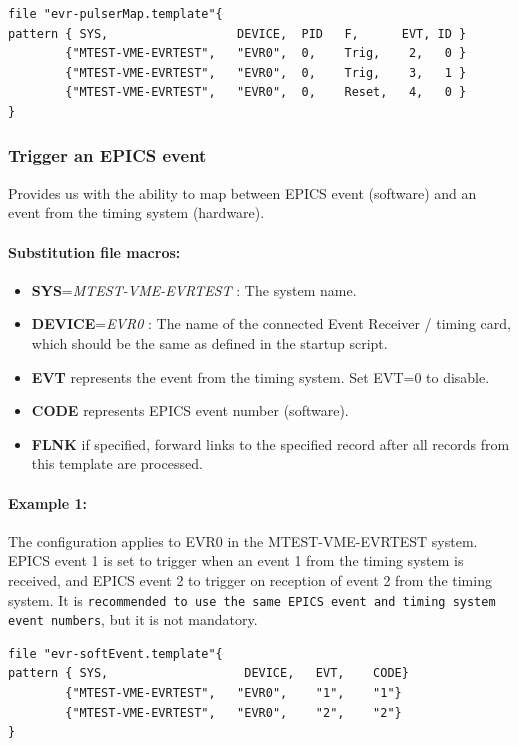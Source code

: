 \documentclass[12pt,a4paper]{article}
\begin{document}
\begin{verbatim}
file "evr-pulserMap.template"{
pattern { SYS,                  DEVICE,  PID   F,      EVT, ID }
        {"MTEST-VME-EVRTEST",   "EVR0",  0,    Trig,    2,   0 }
        {"MTEST-VME-EVRTEST",   "EVR0",  0,    Trig,    3,   1 }
        {"MTEST-VME-EVRTEST",   "EVR0",  0,    Reset,   4,   0 }
}
\end{verbatim}


\subsubsection{Trigger an EPICS event}\label{evr-softevent.template}
Provides us with the ability to map between EPICS event (software) and an event from the timing system (hardware).

\paragraph{Substitution file macros:}
\begin{itemize}
	\item
		\textbf{SYS}=\emph{MTEST-VME-EVRTEST} : The system name.
	\item
		\textbf{DEVICE}=\emph{EVR0} : The name of the connected Event Receiver / timing card, which should be the same as defined in the startup script. 
	\item
	  \textbf{EVT} represents the event from the timing system. Set EVT=0 to disable.
	\item
	  \textbf{CODE} represents EPICS event number (software).
	\item 
	  \textbf{FLNK} if specified, forward links to the specified record after all records from this template are processed.
\end{itemize}

\paragraph{Example 1:} The configuration applies to EVR0 in the MTEST-VME-EVRTEST system. EPICS event 1 is set to trigger when an event 1 from the timing system is received, and EPICS event 2 to trigger on reception of event 2 from the timing system. It is \texttt{recommended to use the same EPICS event and timing system event numbers}, but it is not mandatory.

\begin{verbatim}
file "evr-softEvent.template"{
pattern { SYS,                   DEVICE,   EVT,    CODE}
        {"MTEST-VME-EVRTEST",   "EVR0",    "1",    "1"}
        {"MTEST-VME-EVRTEST",   "EVR0",    "2",    "2"}
}
\end{verbatim}
\end{document}
